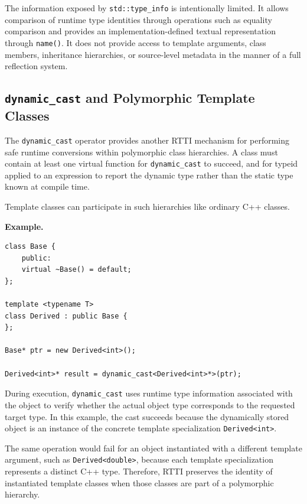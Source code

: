 \documentclass[11pt]{report}
\begin{document}
The information exposed by \texttt{std::type\_info} is intentionally 
limited.
It allows comparison of runtime type identities through operations such as
equality comparison and provides an implementation-defined textual
representation through \texttt{name()}. It does not provide access to
template arguments, class members, inheritance hierarchies, or source-level
metadata in the manner of a full reflection system.

\subsection{\texttt{dynamic\_cast} and Polymorphic Template Classes}
\label{CppTemplates:Reflection:DynamicCast}

The \texttt{dynamic\_cast} operator  provides another RTTI mechanism for
performing safe runtime conversions within polymorphic class hierarchies. A
class must contain at least one virtual function for \texttt{dynamic\_cast} to
succeed, and for typeid applied to an expression to report the dynamic type
rather than the static type known at compile time.

Template classes can participate in such hierarchies like ordinary C++
classes.

\begin{examplebox}
\textbf{Example.}

\begin{lstlisting}
class Base {
    public:
    virtual ~Base() = default;
};

template <typename T>
class Derived : public Base {
};

Base* ptr = new Derived<int>();

Derived<int>* result = dynamic_cast<Derived<int>*>(ptr);
\end{lstlisting}
\end{examplebox}

During execution, \texttt{dynamic\_cast} uses runtime type information
associated with the object to verify whether the actual object type
corresponds to the requested target type. In this example, the cast succeeds
because the dynamically stored object is an instance of the concrete
template specialization \texttt{Derived<int>}.

The same operation would fail for an object instantiated with a different
template argument, such as \texttt{Derived<double>}, because each template
specialization represents a distinct C++ type. Therefore, RTTI preserves the
identity of instantiated template classes when those classes are part of a
polymorphic hierarchy.
\end{document}
